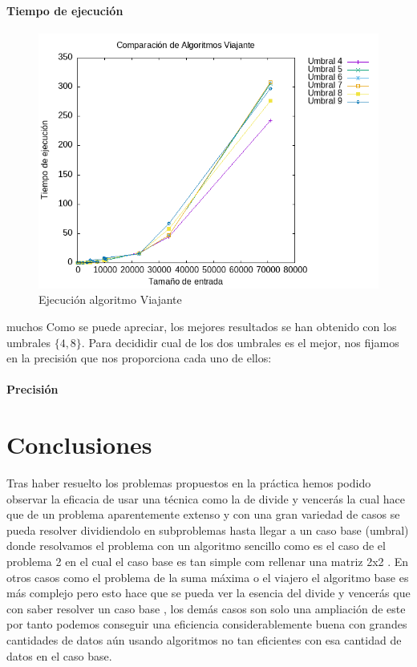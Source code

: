\documentclass[11pt,openany]{book}
\begin{document}
\subsubsection*{Tiempo de ejecución}
\begin{center}
      \begin{figure}[H]
            \centering
            \includegraphics[width=0.7\linewidth]{assets/Img/UmbralP3.png}
            \caption{Ejecución algoritmo Viajante}
            \label{fig:Viajante}
      \end{figure}
\end{center}muchos
Como se puede apreciar, los mejores resultados se han obtenido con los umbrales $\{4,8\}$.
Para decididir cual de los dos umbrales es el mejor, nos fijamos en la precisión
que nos proporciona cada uno de ellos:
\subsubsection*{Precisión}



\chapter{Conclusiones}

Tras haber resuelto los problemas propuestos en la práctica hemos podido observar la eficacia
de usar una técnica como la de divide y vencerás la cual hace que de un problema aparentemente 
extenso y con una gran variedad de casos se pueda resolver dividiendolo  en subproblemas hasta llegar 
a un caso base (umbral) donde resolvamos el problema con un algoritmo sencillo como es el caso de 
el problema 2 en el cual el caso base es tan simple com rellenar una matriz 2x2 . En otros casos como 
el problema de la suma máxima o  el viajero  el algoritmo base es más complejo pero esto hace que se pueda ver la esencia del 
divide y vencerás que con saber resolver un caso base , los demás casos son solo una ampliación de este por tanto podemos conseguir una
eficiencia considerablemente buena con grandes cantidades de datos  aún usando algoritmos no tan eficientes con esa cantidad de  datos en el caso base.
\end{document}
